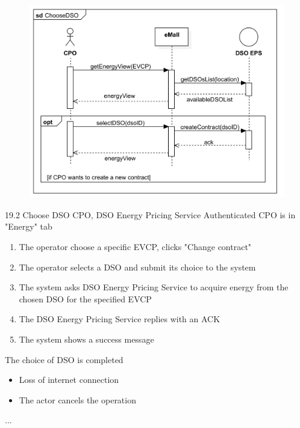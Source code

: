 \usecase
{
    \begin{figure}[H]
        \centering
        \includegraphics[scale=0.9]{src/sequence_diagram/retrievePrices&chooseDSO.png}
    \end{figure}
}
{19.2}
{Choose DSO} %
{CPO, DSO Energy Pricing Service} %
{Authenticated CPO is in "Energy" tab} %
{ %
    \begin{enumerate}
        \item The operator choose a specific EVCP, clicks "Change contract"
        \item The operator selects a DSO and submit its choice to the system
        \item The system asks DSO Energy Pricing Service to acquire energy from the chosen DSO for the specified EVCP
        \item The DSO Energy Pricing Service replies with an ACK
        \item The system shows a success message
    \end{enumerate}
}
{The choice of DSO is completed} %
{ %
    \begin{itemize}
        \item Loss of internet connection
        \item The actor cancels the operation
    \end{itemize}
}
{ %
    ...
}

\pagebreak

